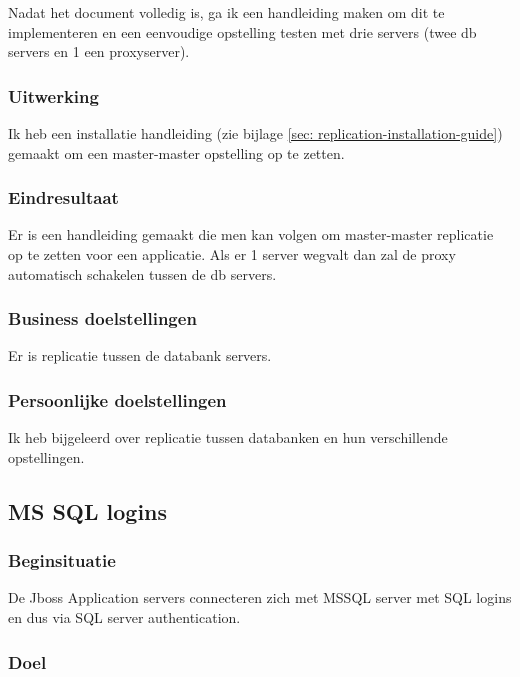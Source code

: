 Nadat het document volledig is, ga ik een handleiding maken om dit te implementeren en een eenvoudige opstelling testen met drie servers (twee \gls{db} servers en 1 een proxyserver).

\subsubsection{Uitwerking}

Ik heb een installatie handleiding (zie bijlage \ref{sec: replication-installation-guide}) gemaakt om een master-master opstelling op te zetten.

\subsubsection{Eindresultaat}

Er is een handleiding gemaakt die men kan volgen om master-master replicatie op te zetten voor een applicatie. Als er 1 server wegvalt dan zal de proxy automatisch schakelen tussen de \gls{db} servers.

\subsubsection{Business doelstellingen}

Er is replicatie tussen de databank servers.

\subsubsection{Persoonlijke doelstellingen}

Ik heb bijgeleerd over replicatie tussen databanken en hun verschillende opstellingen.

\pagebreak

\subsection{MS SQL logins}

\subsubsection{Beginsituatie}

De Jboss Application servers connecteren zich met MSSQL server met SQL logins en dus via SQL server authentication.

\subsubsection{Doel}

